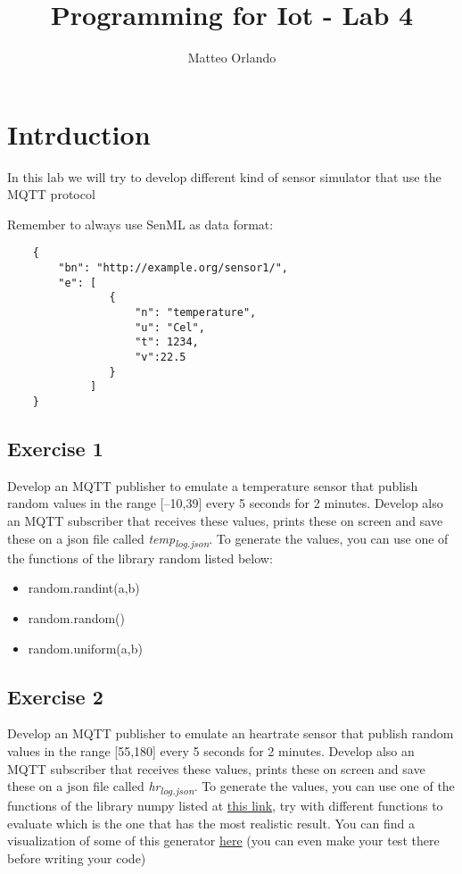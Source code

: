 \documentclass{article}
\author{Matteo Orlando}
\date{}
\title{Programming for Iot - Lab 4}
\begin{document}
\maketitle
\tableofcontents


\section{Intrduction}
\label{intrduction}
In this lab we will try to develop different kind of sensor simulator
that use the MQTT protocol

Remember to always use SenML as data format:

\begin{verbatim}
    {
        "bn": "http://example.org/sensor1/", 
        "e": [
                {
                    "n": "temperature", 
                    "u": "Cel", 
                    "t": 1234, 
                    "v":22.5 
                } 
             ]
    }
\end{verbatim}

\subsection{Exercise 1}
\label{exercise-1}
Develop an MQTT publisher to emulate a temperature sensor that publish
random values in the range [--10,39] every 5 seconds for 2 minutes.
Develop also an MQTT subscriber that receives these values, prints these
on screen and save these on a json file called \emph{temp\textsubscript{log.json}}. To
generate the values, you can use one of the functions of the library
random listed below:

\begin{itemize}
\item random.randint(a,b)

\item random.random()

\item random.uniform(a,b)
\end{itemize}

\subsection{Exercise 2}
\label{exercise-2}
Develop an MQTT publisher to emulate an heartrate sensor that publish
random values in the range [55,180] every 5 seconds for 2 minutes.
Develop also an MQTT subscriber that receives these values, prints these
on screen and save these on a json file called \emph{hr\textsubscript{log.json}}. To
generate the values, you can use one of the functions of the library
numpy listed at
\href{https://docs.scipy.org/doc/numpy-1.15.0/reference/routines.random.html}{this
link}, try with different functions to evaluate which is the one that
has the most realistic result. You can find a visualization of some of
this generator
\href{https://colab.research.google.com/drive/1JsxjaRDYnoMb6dQ5MZsLKH7ZDy7QzH9O?usp=sharing}{here}
(you can even make your test there before writing your code)
\end{document}

